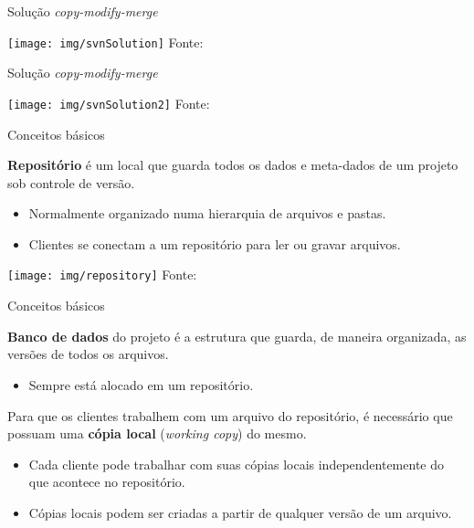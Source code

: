 \documentclass[a4paper]{beamer}
\begin{document}
\begin{frame}{Solução \textit{copy-modify-merge}}
\begin{center}
\texttt{[image: img/svnSolution]}
\hspace{5pt}
{\scriptsize Fonte: \cite{svnBook}}
\end{center}
\end{frame}

\begin{frame}{Solução \textit{copy-modify-merge}}
\begin{center}
\texttt{[image: img/svnSolution2]}
\hspace{5pt}
{\scriptsize Fonte: \cite{svnBook}}
\end{center}
\end{frame}

\begin{frame}{Conceitos básicos}

\textbf{Repositório} é um local que guarda todos os dados e meta-dados de um projeto sob controle de versão.

\begin{itemize}
\item Normalmente organizado numa hierarquia de arquivos e pastas.
\item Clientes se conectam a um repositório para ler ou gravar arquivos.
\end{itemize}

\begin{center}
\texttt{[image: img/repository]}
\hspace{5pt}
{\scriptsize Fonte: \cite{svnBook}}
\end{center}

\end{frame}

\begin{frame}{Conceitos básicos}

\textbf{Banco de dados} do projeto é a estrutura que guarda, de maneira organizada, as versões de todos os arquivos.
\begin{itemize}
\item Sempre está alocado em um repositório.
\end{itemize}
\pause

Para que os clientes trabalhem com um arquivo do repositório, é necessário que possuam uma \textbf{cópia local} (\textit{working copy}) do mesmo.
\begin{itemize}
\item Cada cliente pode trabalhar com suas cópias locais independentemente do que acontece no repositório.
\item Cópias locais podem ser criadas a partir de qualquer versão de um arquivo.
\end{itemize}

\end{frame}
\end{document}
